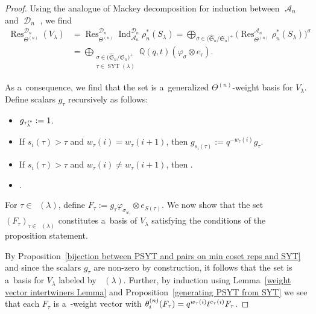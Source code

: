 \documentclass[pdftex]{sigma}
\numberwithin{equation}{section}
\theoremstyle{definition}
\DeclareMathOperator{\SYT}{\mathrm{SYT}}
\DeclareMathOperator{\PSYT}{\mathrm{PSYT}_{\geq 0}}
\DeclareMathOperator{\sA}{\mathscr{A}}
\DeclareMathOperator{\sD}{\mathscr{D}}
\DeclareMathOperator{\Ind}{Ind}
\DeclareMathOperator{\Res}{Res}
\begin{document}
\begin{proof}
 Using the analogue of Mackey decomposition for induction between $\sA_n$ and $\sD_n$ \cite[Proposition~3.9.5]{CherednikBook}, we find
 \begin{align*}
 \Res_{\Theta^{(n)}}^{\sD_n}(V_{\lambda}) &= \Res_{\Theta^{(n)}}^{\sD_n} \Ind_{\sA_n}^{\sD_n} \rho_n^{*}(S_{\lambda})
 = \bigoplus_{\sigma \in \bigl( \widehat{\mathfrak{S}}_n/\mathfrak{S}_n \bigr)^{+}} \bigl( \Res_{\Theta^{(n)}}^{\sA_n} \rho_n^{*}(S_{\lambda}) \bigr)^{\sigma} \\
 &= \bigoplus_{\substack{\sigma \in \bigl( \widehat{\mathfrak{S}}_n/\mathfrak{S}_n \bigr)^{+}\\ \tau \in \SYT(\lambda)}} \mathbb{Q}(q,t) (\varphi_{\sigma}\otimes e_{\tau}).
 \end{align*}

 As a~consequence, we find that the set \smash{$\{\varphi_{\sigma}\otimes e_{\tau}\}_{(\sigma,\tau) \in ( \widehat{\mathfrak{S}}_n/\mathfrak{S}_n )^{+} \times \SYT(\lambda)}$} is a~generalized $\Theta^{(n)}$-weight basis for $V_{\lambda}$. Define scalars $g_{\tau}$ recursively as follows:
 \begin{itemize}
\itemsep=0pt
 \item $g_{\tau_{\lambda}^{\rm rs}}:= 1$.
 \item If $s_i(\tau)> \tau$ and $w_{\tau}(i) = w_{\tau}(i+1)$, then $g_{s_i(\tau)}:= q^{-w_{\tau}(i)}g_{\tau}$.
 \item If $s_i(\tau) > \tau$ and $w_{\tau}(i)\neq w_{\tau}(i+1)$, then .
 \item {}.
 \end{itemize}
 For $\tau \in \PSYT(\lambda)$, define $F_{\tau} := g_{\tau} \varphi_{\sigma_{w_{\tau}}} \otimes e_{S(\tau)}$. We now show that the set $(F_{\tau})_{\tau \in \PSYT(\lambda)}$ constitutes a~basis of $V_{\lambda}$ satisfying the conditions of the proposition statement.

 By Proposition~\ref{bijection between PSYT and pairs on min coset reps and SYT} and since the scalars $g_{\tau}$ are non-zero by construction, it follows that the set \smash{$(F_{\tau})_{\tau \in \PSYT(\lambda)}$} is a~basis for $V_{\lambda}$ labeled by $\PSYT(\lambda)$. Further, by induction using Lemma~\ref{weight vector intertwiners Lemma} and Proposition~\ref{generating PSYT from SYT} we see that each $F_{\tau}$ is a~-weight vector with $\smash{\theta_i^{(n)}(F_{\tau})} = q^{w_{\tau}(i)}t^{c_{\tau}(i)}F_{\tau}$.


\end{proof}
\end{document}
